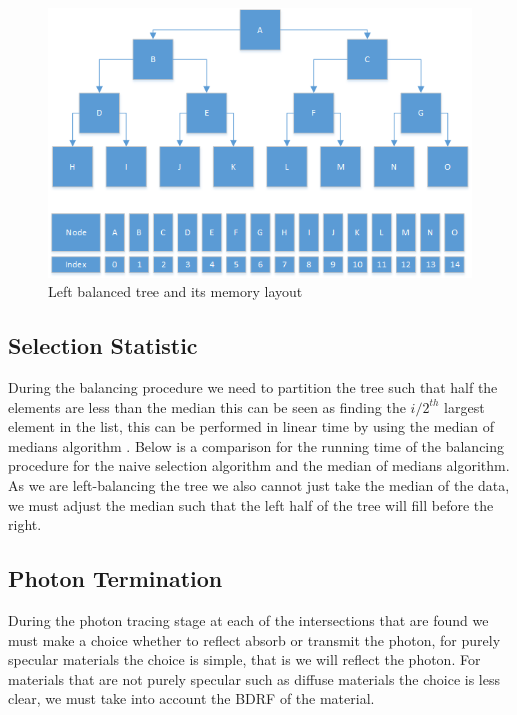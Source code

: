 \begin{figure}
\centering
\includegraphics[scale=0.75]{./implementation/left-balanced-tree.png}
\caption{Left balanced tree and its memory layout}
\end{figure}

\subsection{Selection Statistic}
During the balancing procedure we need to partition the tree such that half the elements are less than the median
this can be seen as finding the $i/2^{th}$ largest element in the list, this can be performed in linear time by using
the median of medians algorithm . Below is a comparison for the running time of the balancing procedure for
the naive selection algorithm and the median of medians algorithm. As we are left-balancing the tree we also cannot
just take the median of the data, we must adjust the median such that the left half of the tree will fill before the right.


\subsection{Photon Termination}
During the photon tracing stage at each of the intersections that are found we must make a choice whether to reflect absorb or transmit
the photon, for purely specular materials the choice is simple, that is we will reflect the photon. For materials that are not purely
specular such as diffuse materials the choice is less clear, we must take into account the BDRF of the material.
